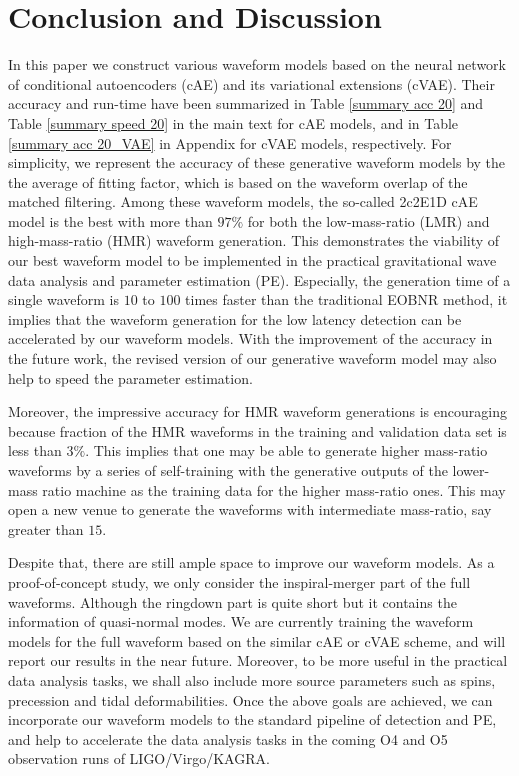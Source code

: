 \documentclass[twocolumn,prd,superscriptaddress,nofootinbib]{revtex4-1}
\begin{document}
\section{Conclusion and Discussion} \label{conclusion}
In this paper we construct various waveform models based on the neural network of conditional autoencoders (cAE) and its variational extensions (cVAE). Their accuracy and run-time have been summarized in Table \ref{summary acc 20} and Table \ref{summary speed 20} in the main text for cAE models, and in Table \ref{summary acc 20_VAE} in Appendix for cVAE models, respectively. For simplicity, we represent the accuracy of these generative waveform models by the the average of fitting factor, which is based on the waveform overlap of the matched filtering. Among these waveform models, the so-called 2c2E1D cAE model is the best with more than $97\%$ for both the low-mass-ratio (LMR) and high-mass-ratio (HMR) waveform generation. This demonstrates the viability of our best waveform model to be implemented in the practical gravitational wave data analysis and parameter estimation (PE). Especially, the generation time of a single waveform is $10$ to $100$ times faster than the traditional EOBNR method, it implies that the waveform generation for the low latency detection can be accelerated by our waveform models. With the improvement of the accuracy in the future work, the revised version of our generative waveform model may also help to speed the parameter estimation. 
 
Moreover, the impressive accuracy for HMR waveform generations is encouraging because fraction of the HMR waveforms in the training and validation data set is less than $3\%$. This implies that one may be able to generate higher mass-ratio waveforms by a series of self-training with the generative outputs of the lower-mass ratio machine as the training data for the higher mass-ratio ones. This may open a new venue to generate the waveforms with intermediate mass-ratio, say greater than $15$.




Despite that, there are still ample space to improve our waveform models. As a proof-of-concept study, we only consider the inspiral-merger part of the full waveforms. Although the ringdown part is quite short but it contains the information of quasi-normal modes. We are currently training the waveform models for the full waveform based on the similar cAE or cVAE scheme, and will report our results in the near future. Moreover, to be more useful in the practical data analysis tasks, we shall also include more source parameters such as spins, precession and tidal deformabilities. Once the above goals are achieved, we can incorporate our waveform models to the standard pipeline of detection and PE, and help to accelerate the data analysis tasks in the coming O4 and O5 observation runs of LIGO/Virgo/KAGRA. 
\end{document}
